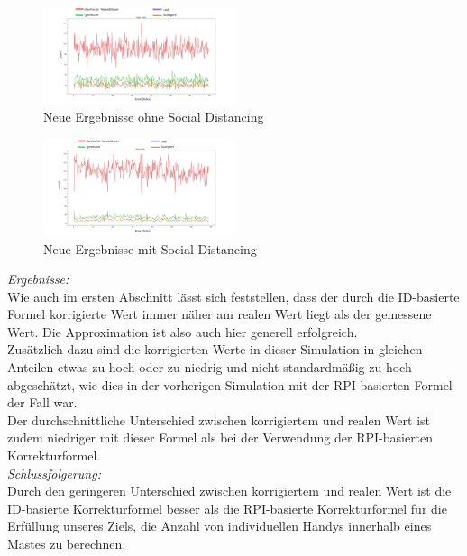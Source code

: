 \documentclass[conference,compsoc]{IEEEtran}
\begin{document}
\begin{figure}[h]
	\centering
	\includegraphics[width=0.5\textwidth]{"Mast_Data_Plotted"}
	\caption{Neue Ergebnisse ohne Social Distancing}
	\label{mast_data_plotted}
\end{figure}

\begin{figure}[h]
	\centering
	\includegraphics[width=0.5\textwidth]{"Mast_Data_Plotted_Social_Distancing"}
	\caption{Neue Ergebnisse mit Social Distancing}
	\label{mast_data_plotted_social_distancing}
\end{figure}

\textit{Ergebnisse:}\\
Wie auch im ersten Abschnitt lässt sich feststellen, dass der durch die ID-basierte Formel korrigierte Wert immer näher am realen Wert liegt als der gemessene Wert. Die Approximation ist also auch hier generell erfolgreich.\\
Zusätzlich dazu sind die korrigierten Werte in dieser Simulation in gleichen Anteilen etwas zu hoch oder zu niedrig und nicht standardmäßig zu hoch abgeschätzt, wie dies in der vorherigen Simulation mit der RPI-basierten Formel der Fall war.\\
Der durchschnittliche Unterschied zwischen korrigiertem und realen Wert ist zudem niedriger mit dieser Formel als bei der Verwendung der RPI-basierten Korrekturformel.\\

\textit{Schlussfolgerung:}\\
Durch den geringeren Unterschied zwischen korrigiertem und realen Wert ist die ID-basierte Korrekturformel besser als die RPI-basierte Korrekturformel für die Erfüllung unseres Ziels, die Anzahl von individuellen Handys innerhalb eines Mastes zu berechnen.\\
\end{document}
